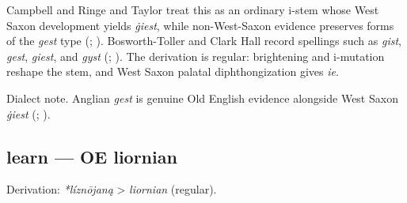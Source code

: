 \documentclass[
  british,
  a4paper,
]{article}
\begin{document}
Campbell and Ringe and Taylor treat this as an ordinary i-stem whose
West Saxon development yields \emph{ġiest}, while non-West-Saxon
evidence preserves forms of the \emph{gest} type
(;
).
Bosworth-Toller and Clark Hall record spellings such as \emph{gist},
\emph{gest}, \emph{giest}, and \emph{gyst}
(;
). The derivation is
regular: brightening and i-mutation reshape the stem, and West Saxon
palatal diphthongization gives \emph{ie}.

Dialect note. Anglian \emph{gest} is genuine Old English evidence
alongside West Saxon \emph{ġiest} (; ).

\subsection{learn --- OE liornian}\label{learn-oe-liornian}

Derivation: \emph{*líznōjaną} \textgreater{} \emph{liornian} (regular).

\begingroup
\setlength{\fboxsep}{6pt}
\end{document}
